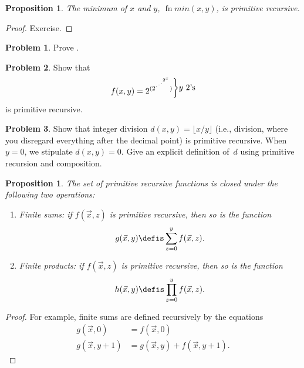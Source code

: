 \documentclass[10pt,a4paper]{article}
\makeatletter
\theoremstyle{plain}
\newtheorem{prop}[thm]{Proposition}
\theoremstyle{definition}
\newtheorem{prob}{Problem}[section]
\theoremstyle{remark}
\newcommand*{\ollabel}[1]{\label{#1}}
\newcommand{\olref}{\@ifnextchar[{\olref@i}{\olref@final}}
\def\olref@i[#1]{\@ifnextchar[{\olref@ii}{\olref@final}}
\def\olref@ii[#1]{\@ifnextchar[{\olref@iii}{\olref@final}}
\def\olref@iii[#1]{\olref@final}
\def\olref@final#1{\ref{#1}}
\providecommand{\fn}{\operatorname{fn}}
\makeatother
\begin{document}
\begin{prop}
  \ollabel{prop:min-pr}
  The minimum of $x$ and $y$, $\fn{min}(x,y)$, is primitive recursive.
\end{prop}

\begin{proof}
  Exercise.
\end{proof}

\begin{prob}
  Prove \olref[cmp][rec][exa]{prop:min-pr}.
\end{prob}

\begin{prob}
Show that \[
f(x, y) =
2^{(2^{\iddots^{2^{x}}})}\raisebox{1ex}{\bigg\rbrace}
\raisebox{1ex}{\text {$y$ $2$'s}}\] is primitive recursive.
\end{prob}

\begin{prob}
Show that integer division $d(x, y) = \lfloor x/y \rfloor$ (i.e.,
division, where you disregard everything after the decimal point) is
primitive recursive. When $y = 0$, we stipulate $d(x, y) = 0$. Give an
explicit definition of~$d$ using primitive recursion and
composition.
\end{prob}

\begin{prop}
The set of primitive recursive functions is closed under the
following two operations:
\begin{enumerate}
\item Finite sums: if $f(\vec x, z)$ is primitive recursive, then so
is the function
\[
g(\vec x, y) \defis \sum_{z = 0}^y f(\vec x, z).
\]
\item Finite products: if $f(\vec x, z)$ is primitive recursive, then
so is the function
\[
h(\vec x, y) \defis \prod_{z = 0}^y f(\vec x, z).
\]
\end{enumerate}
\end{prop}

\begin{proof}
For example, finite sums are defined recursively by the equations
\begin{align*}
  g(\vec x, 0) & = f(\vec x, 0)\\
  g(\vec x, y+1) & = g(\vec x, y) + f(\vec x, y+1).
\end{align*}
\end{proof}



\end{document}
